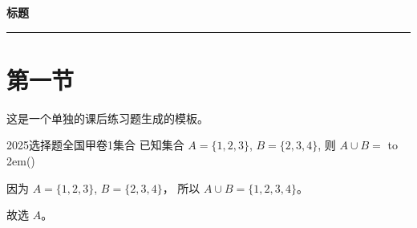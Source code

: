 \documentclass[12pt,UTF-8,a4paper]{ctexart}
\newcommand{\mytitle}{}
\numberwithin{figure}{section}
\theoremstyle{mystyle}
\theoremstyle{mystylekaishu}
\theoremstyle{mystyle}
\numberwithin{xiti}{section}
\newcommand{\paren}[1][]{%
  \unskip\nobreak\hfill\allowbreak
  \hbox to 2em{\hfil(\quad#1\quad)\hfil}%
}
\begin{document}
\thispagestyle{plain} %
\renewcommand{\mytitle}{标题}

\begin{center}
  {\Huge\bfseries\color{structure} \mytitle}
  \vspace{0.5em}
  
  \textcolor{structure}{\rule{\linewidth}{1.5pt}}
\end{center}
\vspace{1em}

\section{第一节}

这是一个单独的课后练习题生成的模板。

\begin{problem}{2025}{选择题}{全国甲卷}{1}{集合}
已知集合   $A = \{1, 2, 3\}$,  $B= \{2, 3, 4\}$, 则  $A \cup B = $ \paren
\begin{choices}
    \choice{$\emptyset$}
\end{choices}
\end{problem}

\begin{solutions}
因为  $ A = \{1, 2, 3\}$, $B = \{2, 3, 4\}$，
所以  $ A \cup B = \{1, 2, 3, 4\}$。

故选 $A$。
\end{solutions}
\end{document}
